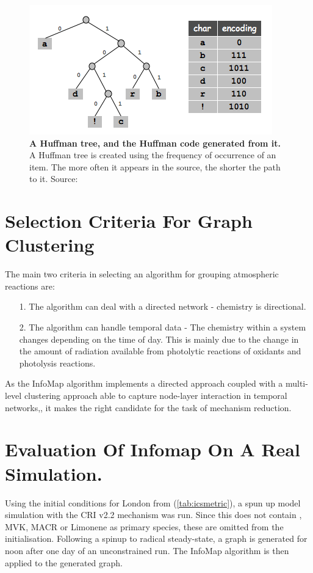 \begin{figure}[H]
  \centering
  \includegraphics[width=.7\textwidth]{fig/huff.png}
  \caption{\textbf{A Huffman tree, and the Huffman code generated from it.} A Huffman tree is created using the frequency of occurrence of an item. The more often it appears in the source, the shorter the path to it.  Source:\citep{hufftree}}
    \label{fig:huff}
\end{figure}




\section{Selection Criteria For Graph Clustering}

The main two criteria in selecting an algorithm for grouping atmospheric reactions are:

\begin{itemize}
    \item[1.] The algorithm can deal with a directed network - chemistry is directional.
    \item[2.] The algorithm can handle temporal data - The chemistry within a system changes depending on the time of day. This is mainly due to the change in the amount of radiation available from photolytic reactions of oxidants and photolysis reactions.
\end{itemize}

As the InfoMap algorithm implements a directed approach coupled with a multi-level clustering approach able to capture node-layer interaction in temporal networks,\citep{infointermittent}, it makes the right candidate for the task of mechanism reduction.

\section{Evaluation Of Infomap On A Real Simulation.}

Using the initial conditions for London from (\autoref{tab:icsmetric}), a spun up model simulation with the CRI v2.2 mechanism was run. Since this does not contain , MVK, MACR or Limonene as primary species, these are omitted from the initialisation. Following a spinup to radical steady-state, a graph is generated for noon after one day of an unconstrained run. The InfoMap algorithm is then applied to the generated graph.

